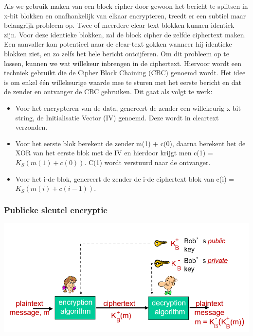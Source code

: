 
Als we gebruik maken van een block cipher door gewoon het bericht te splitsen in x-bit blokken en onafhankelijk van elkaar encrypteren, treedt er een subtiel maar belangrijk probleem op. Twee of meerdere clear-text blokken kunnen identiek zijn. Voor deze identieke blokken, zal de block cipher de zelfde ciphertext maken. Een aanvaller kan potentieel naar de clear-text gokken wanneer hij identieke blokken ziet, en zo zelfs het hele bericht ontcijferen.
Om dit probleem op te lossen, kunnen we wat willekeur inbrengen in de ciphertext. Hiervoor wordt een techniek gebruikt die de Cipher Block Chaining (CBC) genoemd wordt. Het idee is om enkel één willekeurige waarde mee te sturen met het eerste bericht en dat de zender en ontvanger de CBC gebruiken. Dit gaat als volgt te werk:

\begin{itemize}

\item Voor het encrypteren van de data, genereert de zender een willekeurig x-bit string, de Initialisatie Vector (IV) genoemd. Deze wordt in cleartext verzonden.

\item Voor het eerste blok berekent de zender m(1) + c(0), daarna berekent het de XOR van het eerste blok met de IV en hierdoor krijgt men c(1) = $K_S(m(1) + c(0))$. C(1) wordt verstuurd naar de ontvanger.

\item Voor het i-de blok, genereert de zender de i-de ciphertext blok van c(i) = $K_S(m(i) + c(i-1))$.

\end{itemize}


\subsubsection{Publieke sleutel encryptie}

\includegraphics[width=7in]{./img/imghfdst8/hfdst8puntje5.png}\\[1cm]


